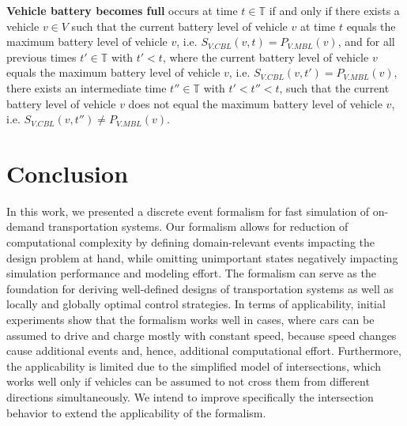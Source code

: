 \documentclass[graybox]{svmult}
\begin{document}
\vspace{2mm}
\noindent \textbf{Vehicle battery becomes full} occurs at time $t \in \mathbb{T}$ if and only if there exists a vehicle $v \in V$ such that the current battery level of vehicle $v$ at time $t$ equals the maximum battery level of vehicle $v$, i.e. $S_{V.CBL}(v,t) = P_{V.MBL}(v)$, and for all previous times $t' \in \mathbb{T}$ with $t' < t$, where the current battery level of vehicle $v$ equals the maximum battery level of vehicle $v$, i.e. $S_{V.CBL}(v,t') = P_{V.MBL}(v)$, there exists an intermediate time $t'' \in \mathbb{T}$ with $t' < t'' < t$, such that the current battery level of vehicle $v$ does not equal the maximum battery level of vehicle $v$, i.e. $S_{V.CBL}(v,t'') \neq P_{V.MBL}(v)$.

\section{Conclusion}
\label{sec:con}

In this work, we presented a discrete event formalism for fast simulation of on-demand transportation systems.
Our formalism allows for reduction of computational complexity by defining domain-relevant events impacting the design problem at hand, while omitting unimportant states negatively impacting simulation performance and modeling effort.
The formalism can serve as the foundation for deriving well-defined designs of transportation systems as well as locally and globally optimal control strategies.
In terms of applicability, initial experiments show that the formalism works well in cases, where cars can be assumed to drive and charge mostly with constant speed, because speed changes cause additional events and, hence, additional computational effort.
Furthermore, the applicability is limited due to the simplified model of intersections, which works well only if vehicles can be assumed to not cross them from different directions simultaneously.
We intend to improve specifically the intersection behavior to extend the applicability of the formalism.



\end{document}
